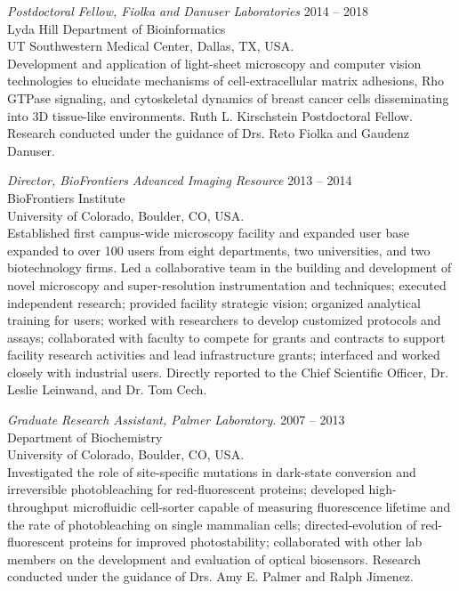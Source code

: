 \documentclass[10pt]{res}
\newcommand{\forceindent}{\leavevmode{\parindent=2em\indent}}
\begin{document}
\begin{resume}
{\sl Postdoctoral Fellow, Fiolka and Danuser Laboratories} \hfill 2014 -- 2018 \\ 
Lyda Hill Department of Bioinformatics \\
UT Southwestern Medical Center, Dallas, TX, USA. \hfill \\
\forceindent Development and application of light-sheet microscopy and computer vision technologies to elucidate mechanisms of cell-extracellular matrix adhesions, Rho GTPase signaling, and cytoskeletal dynamics of breast cancer cells disseminating into 3D tissue-like environments. Ruth L. Kirschstein Postdoctoral Fellow.  Research conducted under the guidance of Drs. Reto Fiolka and Gaudenz Danuser.

{\sl Director, BioFrontiers Advanced Imaging Resource} \hfill 2013 -- 2014 \\ 
BioFrontiers Institute \\
University of Colorado, Boulder, CO, USA. \hfill \\
\forceindent Established first campus-wide microscopy facility and expanded user base expanded to over 100 users from eight departments, two universities, and two biotechnology firms. Led a collaborative team in the building and development of novel microscopy and super-resolution instrumentation and techniques; executed independent research; provided facility strategic vision; organized analytical training for users; worked with researchers to develop customized protocols and assays; collaborated with faculty to compete for grants and contracts to support facility research activities and lead infrastructure grants;  interfaced and worked closely with industrial users.  Directly reported to the Chief Scientific Officer, Dr. Leslie Leinwand, and Dr. Tom Cech.

{\sl Graduate Research Assistant, Palmer Laboratory.} \hfill 2007 -- 2013 \\ 
Department of Biochemistry \\
University of Colorado, Boulder, CO, USA. \\
\forceindent Investigated the role of site-specific mutations in dark-state conversion and irreversible photobleaching for red-fluorescent proteins; developed high-throughput microfluidic cell-sorter capable of measuring fluorescence lifetime and the rate of photobleaching on single mammalian cells; directed-evolution of red-fluorescent proteins for improved photostability; collaborated with other lab members on the development and evaluation of optical biosensors.  Research conducted under the guidance of Drs. Amy E. Palmer and Ralph Jimenez. 


\end{resume}
\end{document}
